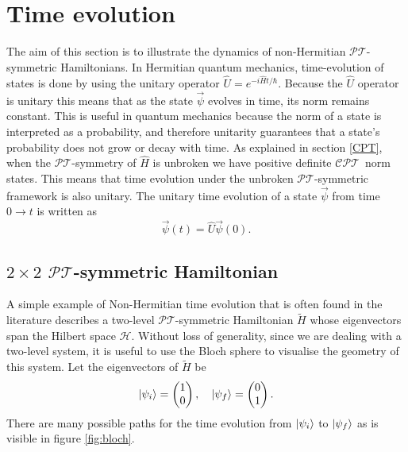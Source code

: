 \documentclass[12pt, a4paper]{report}
\newcommand\PT{\(\mathcal{PT}\)}
\newcommand\CPT{\(\mathcal{CPT}\)}
\begin{document}
\section{Time evolution}\label{Tev}
The aim of this section is to illustrate the dynamics of non-Hermitian \PT-symmetric Hamiltonians. In Hermitian quantum mechanics, time-evolution of states is done by using the unitary operator $\hat{U} = e^{-i\hat{H}t/\hbar}$. Because the $\hat{U}$ operator is unitary this means that as the state $\vec{\psi}$ evolves in time, its norm remains constant. This is useful in quantum mechanics because the norm of a state is interpreted as a probability, and therefore unitarity guarantees that a state's probability does not grow or decay with time. As explained in section \ref{CPT}, when the \PT-symmetry of $\hat{H}$ is unbroken we have positive definite \CPT norm states. This means that time evolution under the unbroken \PT-symmetric framework is also unitary\cite{Jones-Smith}\cite{ComplexExtension}\cite{Mostafazadeh2}. 
The unitary time evolution of a state $\vec{\psi}$ from time $0 \rightarrow t$ is written as
\begin{equation}\label{eq:1.12}
\vec{\psi}(t) = \hat{U} \vec{\psi}(0).
\end{equation}

\subsection{$2\times2$ \PT-symmetric Hamiltonian}
A simple example of Non-Hermitian time evolution that is often found in the literature describes a two-level \PT-symmetric Hamiltonian $\tilde{H}$ whose eigenvectors span the Hilbert space $\mathcal{H}$\cite{Bender_2007}. Without loss of generality, since we are dealing with a two-level system, it is useful to use the Bloch sphere to visualise the geometry of this system. Let the eigenvectors of $\tilde{H}$ be
\begin{align}\label{eq:1.13}
\ket{\psi_{i}} = \begin{pmatrix}
1\\
0\\
\end{pmatrix}, \quad\ket{\psi_f} = \begin{pmatrix}
0\\
1\\
\end{pmatrix}.
\end{align}
There are many possible paths for the time evolution from $\ket{\psi_{i}}$ to $\ket{\psi_{f}}$ as is visible in figure \ref{fig:bloch}.
\end{document}
